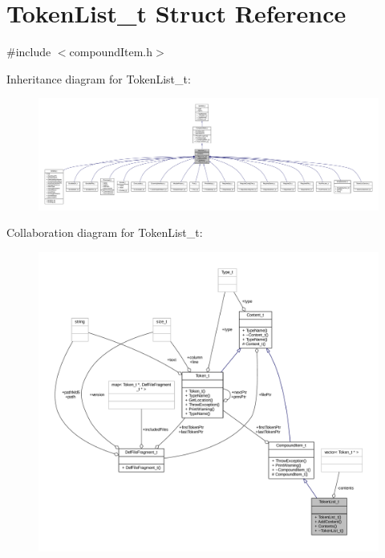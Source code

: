 \hypertarget{struct_token_list__t}{}\section{Token\+List\+\_\+t Struct Reference}
\label{struct_token_list__t}


{\ttfamily \#include $<$compound\+Item.\+h$>$}



Inheritance diagram for Token\+List\+\_\+t\+:
\nopagebreak
\begin{figure}[H]
\begin{center}
\leavevmode
\includegraphics[width=350pt]{struct_token_list__t__inherit__graph}
\end{center}
\end{figure}


Collaboration diagram for Token\+List\+\_\+t\+:
\nopagebreak
\begin{figure}[H]
\begin{center}
\leavevmode
\includegraphics[width=350pt]{struct_token_list__t__coll__graph}
\end{center}
\end{figure}
